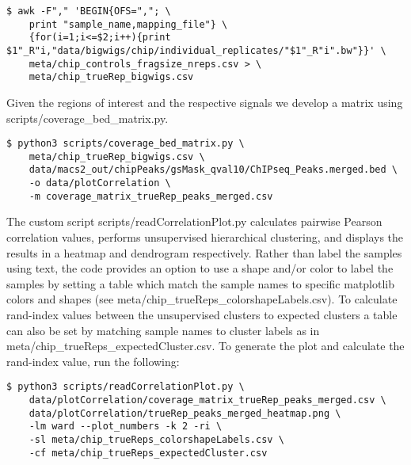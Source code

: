 \documentclass{article}
\begin{document}
\begin{sloppypar}
\begin{verbatim}
$ awk -F"," 'BEGIN{OFS=","; \
	print "sample_name,mapping_file"} \
	{for(i=1;i<=$2;i++){print $1"_R"i,"data/bigwigs/chip/individual_replicates/"$1"_R"i".bw"}}' \
	meta/chip_controls_fragsize_nreps.csv > \
	meta/chip_trueRep_bigwigs.csv
\end{verbatim}

Given the regions of interest and the respective signals we develop a matrix using {\selectfont scripts/coverage\_bed\_matrix.py}.

\begin{verbatim}
$ python3 scripts/coverage_bed_matrix.py \
    meta/chip_trueRep_bigwigs.csv \
    data/macs2_out/chipPeaks/gsMask_qval10/ChIPseq_Peaks.merged.bed \
    -o data/plotCorrelation \
    -m coverage_matrix_trueRep_peaks_merged.csv
\end{verbatim}

The custom script {\selectfont scripts/readCorrelationPlot.py} calculates pairwise Pearson correlation values, performs unsupervised hierarchical clustering, and displays the results in a heatmap and dendrogram respectively. Rather than label the samples using text, the code provides an option to use a shape and/or color to label the samples by setting a table which match the sample names to specific matplotlib colors and shapes (see {\selectfont meta/chip\_trueReps\_colorshapeLabels.csv}). To calculate rand-index values between the unsupervised clusters to expected clusters a table can also be set by matching sample names to cluster labels as in {\selectfont meta/chip\_trueReps\_expectedCluster.csv}. To generate the plot and calculate the rand-index value, run the following:

\begin{verbatim}
$ python3 scripts/readCorrelationPlot.py \
    data/plotCorrelation/coverage_matrix_trueRep_peaks_merged.csv \
    data/plotCorrelation/trueRep_peaks_merged_heatmap.png \
    -lm ward --plot_numbers -k 2 -ri \
    -sl meta/chip_trueReps_colorshapeLabels.csv \
    -cf meta/chip_trueReps_expectedCluster.csv
\end{verbatim}


\end{sloppypar}
\end{document}
